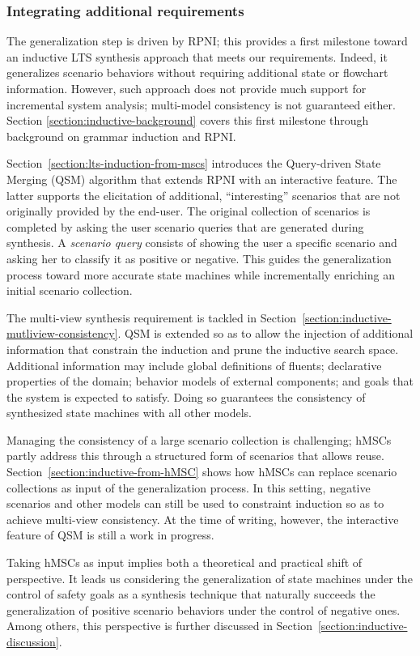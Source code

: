 \subsubsection*{Integrating additional requirements}

The generalization step is driven by RPNI; this provides a first milestone toward an inductive LTS synthesis approach that meets our requirements. Indeed, it generalizes scenario behaviors without requiring additional state or flowchart information. However, such approach does not provide much support for incremental system analysis; multi-model consistency is not guaranteed either. Section \ref{section:inductive-background} covers this first milestone through background on grammar induction and RPNI.

Section~\ref{section:lts-induction-from-mscs} introduces the Query-driven State Merging (QSM) algorithm that extends RPNI with an interactive feature. The latter supports the elicitation of additional, ``interesting'' scenarios that are not originally provided by the end-user. The original collection of scenarios is completed by asking the user scenario queries that are generated during synthesis. A \emph{scenario query} consists of showing the user a specific scenario and asking her to classify it as positive or negative. This guides the generalization process toward more accurate state machines while incrementally enriching an initial scenario collection.

The multi-view synthesis requirement is tackled in Section~\ref{section:inductive-mutliview-consistency}. QSM is extended so as to allow the injection of additional information that constrain the induction and prune the inductive search space. Additional information may include global definitions of fluents; declarative properties of the domain; behavior models of external components; and goals that the system is expected to satisfy. Doing so guarantees the consistency of synthesized state machines with all other models.

Managing the consistency of a large scenario collection is challenging; hMSCs partly address this through a structured form of scenarios that allows reuse. Section~\ref{section:inductive-from-hMSC} shows how hMSCs can replace scenario collections as input of the generalization process. In this setting, negative scenarios and other models can still be used to constraint induction so as to achieve multi-view consistency. At the time of writing, however, the interactive feature of QSM is still a work in progress.

Taking hMSCs as input implies both a theoretical and practical shift of perspective. It leads us considering the generalization of state machines under the control of safety goals as a synthesis technique that naturally succeeds the generalization of positive scenario behaviors under the control of negative ones. Among others, this perspective is further discussed in Section~\ref{section:inductive-discussion}.
